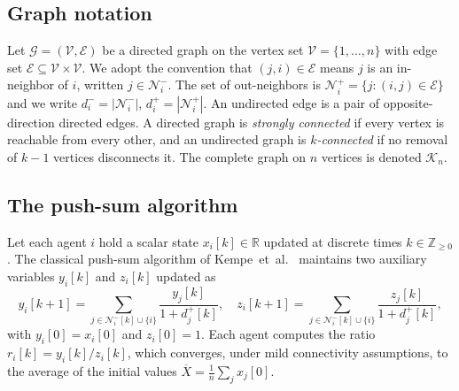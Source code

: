 \documentclass[journal]{IEEEtran}
\newcommand{\NN}{\mathcal{N}}
\newcommand{\GG}{\mathcal{G}}
\newcommand{\VV}{\mathcal{V}}
\newcommand{\EE}{\mathcal{E}}
\begin{document}
\subsection{Graph notation}
Let $\GG=(\VV,\EE)$ be a directed graph on the vertex set
$\VV=\{1,\dots,n\}$ with edge set $\EE\subseteq\VV\times\VV$.  We adopt the
convention that $(j,i)\in\EE$ means $j$ is an in-neighbor of $i$, written
$j\in\NN_i^-$.  The set of out-neighbors is
$\NN_i^+=\{j: (i,j)\in\EE\}$ and we write
$d_i^- = |\NN_i^-|$, $d_i^+ = |\NN_i^+|$.  An undirected edge is a pair of
opposite-direction directed edges.  A directed graph is \emph{strongly
connected} if every vertex is reachable from every other, and an undirected
graph is \emph{$k$-connected} if no removal of $k-1$ vertices disconnects it.
The complete graph on $n$ vertices is denoted $\mathcal{K}_n$.

\subsection{The push-sum algorithm}
Let each agent $i$ hold a scalar state $x_i[k]\in\mathbb{R}$ updated at
discrete times $k\in\mathbb{Z}_{\geq 0}$.  The classical push-sum algorithm of
Kempe~et~al.~\cite{kempe2003pushsum} maintains two auxiliary variables
$y_i[k]$ and $z_i[k]$ updated as
\begin{equation}
\label{eq:pushsum}
y_i[k+1] = \!\!\sum_{j\in\NN_i^-[k]\cup\{i\}}\!\!
\frac{y_j[k]}{1+d_j^+[k]}, \quad
z_i[k+1] = \!\!\sum_{j\in\NN_i^-[k]\cup\{i\}}\!\!
\frac{z_j[k]}{1+d_j^+[k]},
\end{equation}
with $y_i[0]=x_i[0]$ and $z_i[0]=1$.  Each agent computes the ratio
$r_i[k]=y_i[k]/z_i[k]$, which converges, under mild connectivity assumptions,
to the average of the initial values
$\overline{X}=\tfrac{1}{n}\sum_j x_j[0]$.
\end{document}
